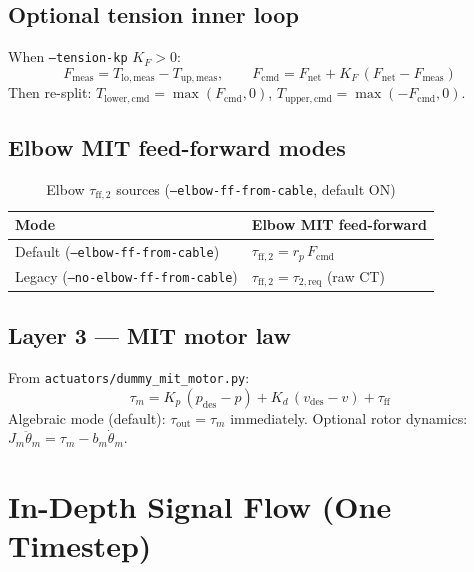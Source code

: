 \documentclass[11pt,a4paper]{article}
\begin{document}
\subsection{Optional tension inner loop}

When \texttt{--tension-kp} $K_F > 0$:
\[
  F_{\mathrm{meas}} = T_{\mathrm{lo,meas}} - T_{\mathrm{up,meas}}, \qquad
  F_{\mathrm{cmd}} = F_{\mathrm{net}} + K_F\,(F_{\mathrm{net}} - F_{\mathrm{meas}})
\]
Then re-split: $T_{\mathrm{lower,cmd}}=\max(F_{\mathrm{cmd}},0)$,
$T_{\mathrm{upper,cmd}}=\max(-F_{\mathrm{cmd}},0)$.

\subsection{Elbow MIT feed-forward modes}

\begin{table}[H]
\centering
\caption{Elbow $\tau_{\mathrm{ff},2}$ sources (\texttt{--elbow-ff-from-cable}, default ON)}
\begin{tabular}{@{}ll@{}}
\toprule
\textbf{Mode} & \textbf{Elbow MIT feed-forward} \\
\midrule
Default (\texttt{--elbow-ff-from-cable}) & $\tau_{\mathrm{ff},2} = r_p\,F_{\mathrm{cmd}}$ \\
Legacy (\texttt{--no-elbow-ff-from-cable}) & $\tau_{\mathrm{ff},2} = \tau_{2,\mathrm{req}}$ (raw CT) \\
\bottomrule
\end{tabular}
\end{table}

\subsection{Layer 3 --- MIT motor law}

From \texttt{actuators/dummy\_mit\_motor.py}:
\[
  \tau_m = K_p\,(p_{\mathrm{des}}-p) + K_d\,(v_{\mathrm{des}}-v) + \tau_{\mathrm{ff}}
\]
Algebraic mode (default): $\tau_{\mathrm{out}}=\tau_m$ immediately.
Optional rotor dynamics: $J_m\ddot\theta_m = \tau_m - b_m\dot\theta_m$.

\section{In-Depth Signal Flow (One Timestep)}
\end{document}
